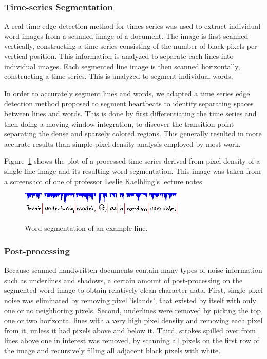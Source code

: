 \documentclass[12pt]{article}
\begin{document}
		\subsubsection{Time-series Segmentation}
		A real-time edge detection method for times series was used to extract individual word images from a scanned image of a document. The image is first scanned vertically, constructing a time series consisting of the number of black pixels per vertical position. This information is analyzed to separate each lines into individual images. Each segmented line image is then scanned horizontally, constructing a time series. This is analyzed to segment individual words.
		
		In order to accurately segment lines and words, we adapted a time series edge detection method proposed to segment heartbeats to identify separating spaces between lines and words. This is done by first differentiating the time series and then doing a moving window integration, to discover the transition point separating the dense and sparsely colored regions. This generally resulted in more accurate results than simple pixel density analysis employed by most work.
		
		Figure~\ref{figure:word_segmentation} shows the plot of a processed time series derived from pixel density of a single line image and its resulting word segmentation. This image was taken from a screenshot of one of professor Leslie Kaelbling's lecture notes.
		
		\begin{figure}[htbp!]
		\centering
		\includegraphics[width=0.7\textwidth]{word_segmentation.png}
		\label{figure:word_segmentation}
		\caption{Word segmentation of an example line.}
		\end{figure}
		
		\subsubsection{Post-processing}
		Because scanned handwritten documents contain many types of noise information such as underlines and shadows, a certain amount of post-processing on the segmented word image to obtain relatively clean character data. First, single pixel noise was eliminated by removing pixel 'islands', that existed by itself with only one or no neighboring pixels. Second, underlines were removed by picking the top one or two horizontal lines with a very high pixel density and removing each pixel from it, unless it had pixels above and below it. Third, strokes spilled over from lines above one in interest was removed, by scanning all pixels on the first row of the image and recursively filling all adjacent black pixels with white.
		
\end{document}
